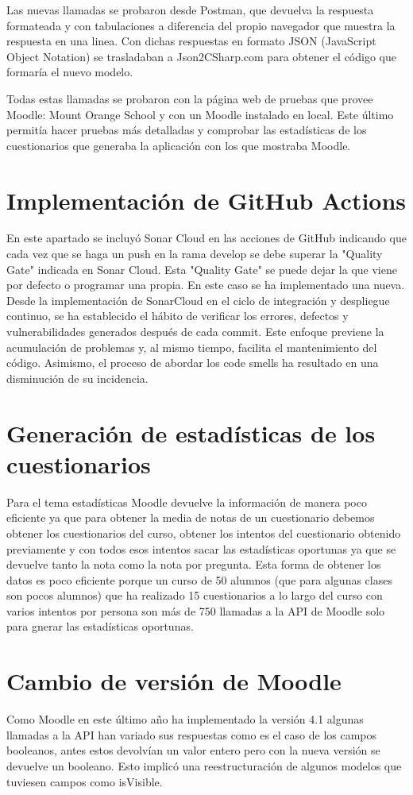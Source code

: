 Las nuevas llamadas se probaron desde Postman, que devuelva la respuesta formateada y con tabulaciones a diferencia del propio navegador que muestra la respuesta en una linea. Con dichas respuestas en formato JSON (JavaScript Object Notation) se trasladaban a Json2CSharp.com para obtener el código que formaría el nuevo modelo.

Todas estas llamadas se probaron con la página web de pruebas que provee Moodle: Mount Orange School y con un Moodle instalado en local. Este último permitía hacer pruebas más detalladas y comprobar las estadísticas de los cuestionarios que generaba la aplicación con los que mostraba Moodle.

\section{Implementación de GitHub Actions}
En este apartado se incluyó Sonar Cloud en las acciones de GitHub indicando que cada vez que se haga un push en la rama develop se debe superar la "Quality Gate" indicada en Sonar Cloud. Esta "Quality Gate" se puede dejar la que viene por defecto o programar una propia. En este caso se ha implementado una nueva. 
Desde la implementación de SonarCloud en el ciclo de integración y despliegue continuo, se ha establecido el hábito de verificar los errores, defectos y vulnerabilidades generados después de cada commit. Este enfoque previene la acumulación de problemas y, al mismo tiempo, facilita el mantenimiento del código. Asimismo, el proceso de abordar los code smells ha resultado en una disminución de su incidencia.

\section{Generación de estadísticas de los cuestionarios}
Para el tema estadísticas Moodle devuelve la información de manera poco eficiente ya que para obtener la media de notas de un cuestionario debemos obtener los cuestionarios del curso, obtener los intentos del cuestionario obtenido previamente y con todos esos intentos sacar las estadísticas oportunas ya que se devuelve tanto la nota como la nota por pregunta.
Esta forma de obtener los datos es poco eficiente porque un curso de 50 alumnos (que para algunas clases son pocos alumnos) que ha realizado 15 cuestionarios a lo largo del curso con varios intentos por persona son más de 750 llamadas a la API de Moodle solo para gnerar las estadísticas oportunas.

\section{Cambio de versión de Moodle}
Como Moodle en este último año ha implementado la versión 4.1 algunas llamadas a la API han variado sus respuestas como es el caso de los campos booleanos, antes estos devolvían un valor entero pero con la nueva versión se devuelve un booleano. Esto implicó una reestructuración de algunos modelos que tuviesen campos como isVisible.